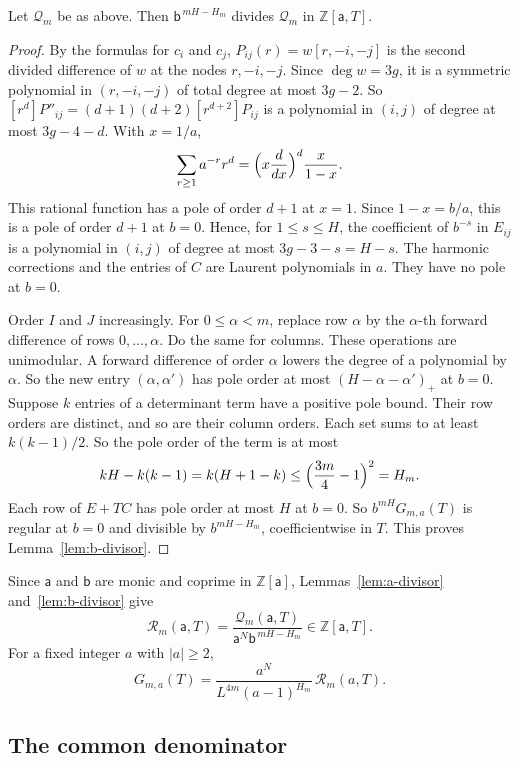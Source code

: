 \begin{lemma}\label{lem:b-divisor}
Let \(\mathcal Q_m\) be as above. Then \(\mathsf b^{\,mH-H_m}\) divides \(\mathcal Q_m\) in \(\mathbb Z[\mathsf a,T]\).
\end{lemma}

\begin{proof}
By the formulas for \(c_i\) and \(c_j\), \(P_{ij}(r)=w[r,-i,-j]\) is the second divided difference of \(w\) at the nodes \(r,-i,-j\). Since \(\deg w=3g\), it is a symmetric polynomial in \((r,-i,-j)\) of total degree at most \(3g-2\). So \([r^d]P''_{ij}=(d+1)(d+2)[r^{d+2}]P_{ij}\) is a polynomial in \((i,j)\) of degree at most \(3g-4-d\). With \(x=1/a\),
\[
 \sum_{r\ge1}a^{-r}r^d=\Bigl(x\frac{d}{dx}\Bigr)^{d}\frac{x}{1-x}.
\]
This rational function has a pole of order \(d+1\) at \(x=1\). Since \(1-x=b/a\), this is a pole of order \(d+1\) at \(b=0\). Hence, for \(1\le s\le H\), the coefficient of \(b^{-s}\) in \(E_{ij}\) is a polynomial in \((i,j)\) of degree at most \(3g-3-s=H-s\). The harmonic corrections and the entries of \(C\) are Laurent polynomials in \(a\). They have no pole at \(b=0\).

Order \(I\) and \(J\) increasingly. For \(0\le\alpha<m\), replace row \(\alpha\) by the \(\alpha\)-th forward difference of rows \(0,\ldots,\alpha\). Do the same for columns. These operations are unimodular. A forward difference of order \(\alpha\) lowers the degree of a polynomial by \(\alpha\). So the new entry \((\alpha,\alpha')\) has pole order at most \((H-\alpha-\alpha')_+\) at \(b=0\). Suppose \(k\) entries of a determinant term have a positive pole bound. Their row orders are distinct, and so are their column orders. Each set sums to at least \(k(k-1)/2\). So the pole order of the term is at most
\[
 kH-k(k-1)=k(H+1-k)\le\Bigl(\frac{3m}4-1\Bigr)^2=H_m.
\]
Each row of \(E+TC\) has pole order at most \(H\) at \(b=0\). So \(b^{mH}G_{m,a}(T)\) is regular at \(b=0\) and divisible by \(b^{mH-H_m}\), coefficientwise in \(T\). This proves Lemma~\ref{lem:b-divisor}.
\end{proof}

Since \(\mathsf a\) and \(\mathsf b\) are monic and coprime in \(\mathbb Z[\mathsf a]\), Lemmas~\ref{lem:a-divisor} and~\ref{lem:b-divisor} give
\[
 \mathcal R_m(\mathsf a,T)=\frac{\mathcal Q_m(\mathsf a,T)}{\mathsf a^N\mathsf b^{\,mH-H_m}}\in\mathbb Z[\mathsf a,T].
\]
For a fixed integer \(a\) with \(|a|\ge2\),
\[
 G_{m,a}(T)=\frac{a^N}{L^{4m}(a-1)^{H_m}}\,\mathcal R_m(a,T).
\]

\subsection{The common denominator}

